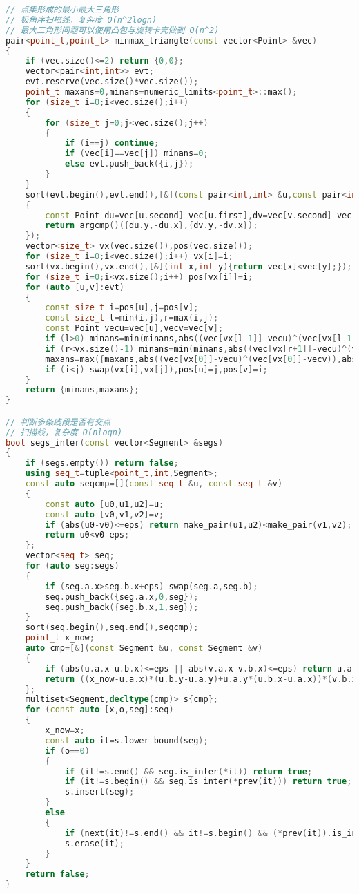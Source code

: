 \documentclass[a4paper]{book}
\begin{document}
\begin{lstlisting}[language=c++]
// 点集形成的最小最大三角形
// 极角序扫描线，复杂度 O(n^2logn)
// 最大三角形问题可以使用凸包与旋转卡壳做到 O(n^2)
pair<point_t,point_t> minmax_triangle(const vector<Point> &vec)
{
    if (vec.size()<=2) return {0,0};
    vector<pair<int,int>> evt;
    evt.reserve(vec.size()*vec.size());
    point_t maxans=0,minans=numeric_limits<point_t>::max();
    for (size_t i=0;i<vec.size();i++)
    {
        for (size_t j=0;j<vec.size();j++)
        {
            if (i==j) continue;
            if (vec[i]==vec[j]) minans=0;
            else evt.push_back({i,j});
        }
    }
    sort(evt.begin(),evt.end(),[&](const pair<int,int> &u,const pair<int,int> &v)
    {
        const Point du=vec[u.second]-vec[u.first],dv=vec[v.second]-vec[v.first];
        return argcmp()({du.y,-du.x},{dv.y,-dv.x});
    });
    vector<size_t> vx(vec.size()),pos(vec.size());
    for (size_t i=0;i<vec.size();i++) vx[i]=i;
    sort(vx.begin(),vx.end(),[&](int x,int y){return vec[x]<vec[y];});
    for (size_t i=0;i<vx.size();i++) pos[vx[i]]=i;
    for (auto [u,v]:evt)
    {
        const size_t i=pos[u],j=pos[v];
        const size_t l=min(i,j),r=max(i,j);
        const Point vecu=vec[u],vecv=vec[v];
        if (l>0) minans=min(minans,abs((vec[vx[l-1]]-vecu)^(vec[vx[l-1]]-vecv)));
        if (r<vx.size()-1) minans=min(minans,abs((vec[vx[r+1]]-vecu)^(vec[vx[r+1]]-vecv)));
        maxans=max({maxans,abs((vec[vx[0]]-vecu)^(vec[vx[0]]-vecv)),abs((vec[vx.back()]-vecu)^(vec[vx.back()]-vecv))});
        if (i<j) swap(vx[i],vx[j]),pos[u]=j,pos[v]=i;
    }
    return {minans,maxans};
}

// 判断多条线段是否有交点
// 扫描线，复杂度 O(nlogn)
bool segs_inter(const vector<Segment> &segs)
{
    if (segs.empty()) return false;
    using seq_t=tuple<point_t,int,Segment>;
    const auto seqcmp=[](const seq_t &u, const seq_t &v)
    {
        const auto [u0,u1,u2]=u;
        const auto [v0,v1,v2]=v;
        if (abs(u0-v0)<=eps) return make_pair(u1,u2)<make_pair(v1,v2);
        return u0<v0-eps;
    };
    vector<seq_t> seq;
    for (auto seg:segs)
    {
        if (seg.a.x>seg.b.x+eps) swap(seg.a,seg.b);
        seq.push_back({seg.a.x,0,seg});
        seq.push_back({seg.b.x,1,seg});
    }
    sort(seq.begin(),seq.end(),seqcmp);
    point_t x_now;
    auto cmp=[&](const Segment &u, const Segment &v)
    {
        if (abs(u.a.x-u.b.x)<=eps || abs(v.a.x-v.b.x)<=eps) return u.a.y<v.a.y-eps;
        return ((x_now-u.a.x)*(u.b.y-u.a.y)+u.a.y*(u.b.x-u.a.x))*(v.b.x-v.a.x)<((x_now-v.a.x)*(v.b.y-v.a.y)+v.a.y*(v.b.x-v.a.x))*(u.b.x-u.a.x)-eps;
    };
    multiset<Segment,decltype(cmp)> s{cmp};
    for (const auto [x,o,seg]:seq)
    {
        x_now=x;
        const auto it=s.lower_bound(seg);
        if (o==0)
        {
            if (it!=s.end() && seg.is_inter(*it)) return true;
            if (it!=s.begin() && seg.is_inter(*prev(it))) return true;
            s.insert(seg);
        }
        else
        {
            if (next(it)!=s.end() && it!=s.begin() && (*prev(it)).is_inter(*next(it))) return true;
            s.erase(it);
        }
    }
    return false;
}


\end{lstlisting}
\end{document}
